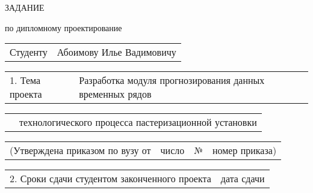 \documentclass[12pt, А4]{article} %
\begin{document}
    \begin{Center} %

        \fontsize{24}{30} \textsf{ЗАДАНИЕ}
        \par %
        \fontsize{14}{17.5} \textrm{по дипломному проектирование}

    \end{Center}  %

\fontsize{12}{15} %

    \begin{FlushLeft} %

    \begin{tabular}{p{2.2cm} p{14.65cm}} %
        \textsf{Студенту} & 
        \textsf{Абоимову Илье Вадимовичу} \vspace{1pt} \hline 
    \end{tabular} %

    \begin{tabular}{p{3.2cm} p{13.65cm}} %
        \textsf{1. Тема проекта} & 
        \textsf{Разработка модуля прогнозирования данных временных рядов} \vspace{1pt} \hline  
    \end{tabular} %

    \begin{tabular}{p{3.2cm} p{13.65cm}} %
        &
        \textsf{технологического процесса пастеризационной установки} \vspace{1pt} \hline 
    \end{tabular} %

    \begin{tabular}{p{7.0cm} p{3.8cm} p{0.5cm} p{4.7cm}} %
        \textsf{(Утверждена приказом по вузу от} &
        \centering \textsf{число} \vspace{1pt} \hline &
        \centering \textsf{№} &
        \centering \textsf{номер приказа)} \vspace{1pt} \hline
    \end{tabular} %

    \begin{tabular}{p{10.0cm} p{6.85cm}} %
        \textsf{2. Сроки сдачи студентом законченного проекта} &
        \centering \textsf{дата сдачи} \vspace{1pt} \hline
    \end{tabular} %


\end{FlushLeft}
\end{document}
